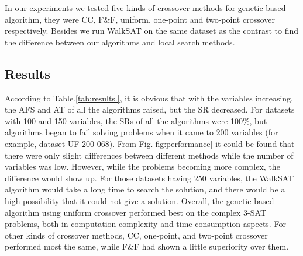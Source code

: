 In our experiments we tested five kinds of crossover methods for genetic-based
algorithm, they were CC, F\&F, uniform, one-point and two-point crossover
respectively. Besides we run WalkSAT on the same dataset as the contrast to
find the difference between our algorithms and local search methods.

\subsection{Results}

According to Table.\ref{tab:results.}, it is obvious that with the
variables increasing, the AFS and AT of all the algorithms raised, but the SR
decreased. For datasets with 100 and 150 variables, the SRs of all the
algorithms were 100\%, but algorithms began to fail solving problems when it
came to 200 variables (for example, dataset UF-200-068). From
Fig.\ref{fig:performance} it could be found that there were only slight
differences between different methods while the number of variables was low.
However, while the problems becoming more complex, the difference would show
up. For those datasets having 250 variables, the WalkSAT algorithm would take
a long time to search the solution, and there would be a high possibility that
it could not give a solution. Overall, the genetic-based algorithm using
uniform crossover performed best on the complex 3-SAT problems, both in
computation complexity and time consumption aspects. For other kinds of
crossover methods, CC, one-point, and two-point crossover performed most the
same, while F\&F had shown a little superiority over them.
